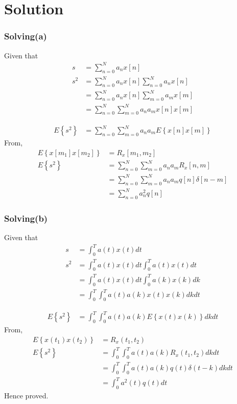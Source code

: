 \documentclass{beamer}
\providecommand{\cbrak}[1]{\ensuremath{\left\{#1\right\}}}
\providecommand{\brak}[1]{\ensuremath{\left(#1\right)}}
\begin{document}
\section{Solution}
\begin{enumerate}
\begin{frame}
\frametitle{Solving(a)}
    \item Given that 
    \begin{align}
        s&=\sum_{n=0}^N a_n x[n]\\
        s^2&=\sum_{n=0}^N a_n x[n]\sum_{n=0}^N a_n x[n]\\
        &=\sum_{n=0}^N a_n x[n]\sum_{m=0}^N a_m x[m]\\
        &=\sum_{n=0}^N\sum_{m=0}^Na_n a_m x[n]x[m]
    \end{align}
\end{frame}
\begin{frame}
    \begin{align}
        E\cbrak{s^2}&=\sum_{n=0}^N\sum_{m=0}^Na_n a_m E\cbrak{x[n]x[m]}
    \end{align}
    From,
     \begin{align}           E\cbrak{x[m_1]x[m_2]}&=R_x[m_1,m_2]\\
        E\cbrak{s^2}&=\sum_{n=0}^N\sum_{m=0}^Na_n a_m R_x[n,m]\\
       &=\sum_{n=0}^N\sum_{m=0}^Na_n a_m q[n]\delta[n - m]\\
        &=\sum_{n=0}^N a_n^2 q[n]
    \end{align}
\end{frame}

\begin{frame}
\frametitle{Solving(b)}
    \item Given that 
    \begin{align}
        s&=\int_0^T a\brak{t}x\brak{t}dt\\
        s^2&=\int_0^T a\brak{t}x\brak{t}dt\int_0^T a\brak{t}x\brak{t}dt\\
        &=\int_0^T a\brak{t}x\brak{t}dt\int_0^T a\brak{k}x\brak{k}dk\\
        &=\int_0^T\int_0^T a\brak{t}a\brak{k}x\brak{t}x\brak{k}dk dt 
    \end{align}
\end{frame}

\begin{frame}
    \begin{align}
        E\cbrak{s^2}&=\int_0^T\int_0^T a\brak{t}a\brak{k}E\cbrak{x\brak{t}x\brak{k}}dk dt
    \end{align}
    From,
     \begin{align}           E\cbrak{x\brak{t_1}x\brak{t_2}}&=R_x\brak{t_1,t_2}\\
     E\cbrak{s^2}&=\int_0^T\int_0^T a\brak{t}a\brak{k}R_x\brak{t_1,t_2}dk dt\\
     &=\int_0^T\int_0^T a\brak{t}a\brak{k}q\brak{t}\delta\brak{t-k}dk dt\\
     &=\int_0^Ta^2\brak{t}q\brak{t}dt
    \end{align}
    Hence proved.
\end{frame}
\end{enumerate}
\end{document}
